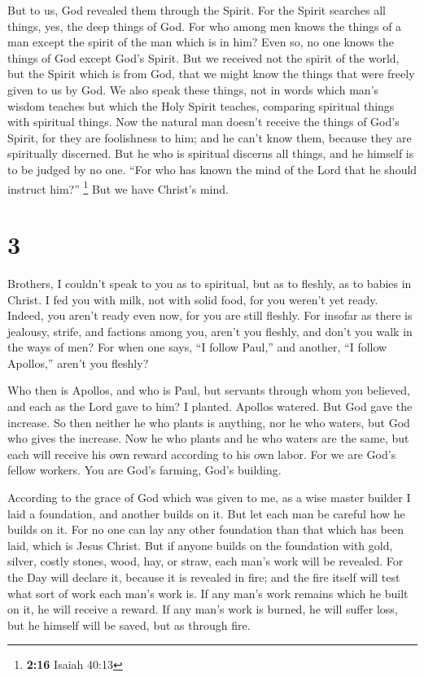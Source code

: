  But to us, God revealed them through the Spirit. For the
Spirit searches all things, yes, the deep things of God. 
For who among men knows the things of a man except the spirit of the man
which is in him? Even so, no one knows the things of God except God's
Spirit.  But we received not the spirit of the world, but
the Spirit which is from God, that we might know the things that were
freely given to us by God.  We also speak these things,
not in words which man's wisdom teaches but which the Holy Spirit
teaches, comparing spiritual things with spiritual things.
 Now the natural man doesn't receive the things of God's
Spirit, for they are foolishness to him; and he can't know them, because
they are spiritually discerned.  But he who is spiritual
discerns all things, and he himself is to be judged by no one.
 ``For who has known the mind of the Lord that he should
instruct him?'' \footnote{\textbf{2:16} Isaiah 40:13} But we have
Christ's mind.

\hypertarget{section-2}{%
\section{3}\label{section-2}}

 Brothers, I couldn't speak to you as to spiritual, but as
to fleshly, as to babies in Christ.  I fed you with milk,
not with solid food, for you weren't yet ready. Indeed, you aren't ready
even now,  for you are still fleshly. For insofar as there
is jealousy, strife, and factions among you, aren't you fleshly, and
don't you walk in the ways of men?  For when one says, ``I
follow Paul,'' and another, ``I follow Apollos,'' aren't you fleshly?

 Who then is Apollos, and who is Paul, but servants
through whom you believed, and each as the Lord gave to him?
 I planted. Apollos watered. But God gave the increase.
 So then neither he who plants is anything, nor he who
waters, but God who gives the increase.  Now he who plants
and he who waters are the same, but each will receive his own reward
according to his own labor.  For we are God's fellow
workers. You are God's farming, God's building.

 According to the grace of God which was given to me, as
a wise master builder I laid a foundation, and another builds on it. But
let each man be careful how he builds on it.  For no one
can lay any other foundation than that which has been laid, which is
Jesus Christ.  But if anyone builds on the foundation
with gold, silver, costly stones, wood, hay, or straw, 
each man's work will be revealed. For the Day will declare it, because
it is revealed in fire; and the fire itself will test what sort of work
each man's work is.  If any man's work remains which he
built on it, he will receive a reward.  If any man's work
is burned, he will suffer loss, but he himself will be saved, but as
through fire.

